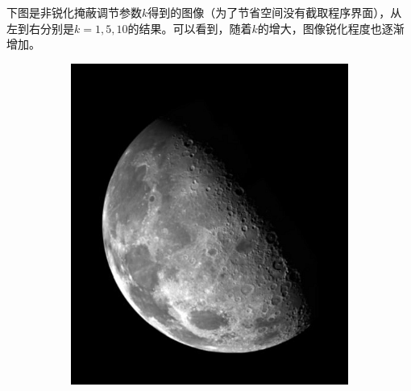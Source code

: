 \documentclass{article}
\begin{document}
下图是非锐化掩蔽调节参数$k$得到的图像（为了节省空间没有截取程序界面），从左到右分别是$k=1, 5, 10$的结果。可以看到，随着$k$的增大，图像锐化程度也逐渐增加。

\begin{figure}[htbp]
    \centering
    \begin{subfigure}{.32\textwidth}
        \includegraphics[width=\linewidth]{img/usm/1.png}
    \end{subfigure}
    \begin{subfigure}{.32\textwidth}

\end{subfigure}
\end{figure}
\end{document}
